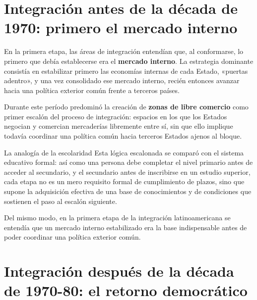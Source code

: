 \documentclass[12pt,oneside]{book}
\begin{document}

\section{Integración antes de la década de 1970: primero el mercado interno}

En la primera etapa, las áreas de integración entendían que, al conformarse, lo primero que debía establecerse era el \textbf{mercado interno}. La estrategia dominante consistía en estabilizar primero las economías internas de cada Estado, «puertas adentro», y una vez consolidado ese mercado interno, recién entonces avanzar hacia una política exterior común frente a terceros países.

Durante este período predominó la creación de \textbf{zonas de libre comercio} como primer escalón del proceso de integración: espacios en los que los Estados negocian y comercian mercaderías libremente entre sí, sin que ello implique todavía coordinar una política común hacia terceros Estados ajenos al bloque.

\begin{example}{La analogía de la escolaridad}
Esta lógica escalonada se comparó con el sistema educativo formal: así como una persona debe completar el nivel primario antes de acceder al secundario, y el secundario antes de inscribirse en un estudio superior, cada etapa no es un mero requisito formal de cumplimiento de plazos, sino que supone la adquisición efectiva de una base de conocimientos y de condiciones que sostienen el paso al escalón siguiente.

Del mismo modo, en la primera etapa de la integración latinoamericana se entendía que un mercado interno estabilizado era la base indispensable antes de poder coordinar una política exterior común.
\end{example}

\section{Integración después de la década de 1970-80: el retorno democrático}
\end{document}
